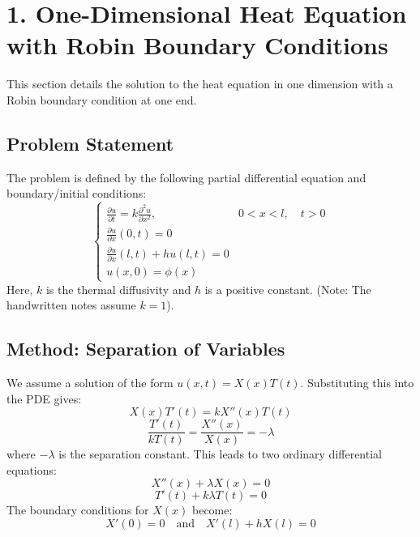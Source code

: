 \documentclass{article}
\begin{document}
	\section*{1. One-Dimensional Heat Equation with Robin Boundary Conditions}
	This section details the solution to the heat equation in one dimension with a Robin boundary condition at one end.
	
	\subsection*{Problem Statement}
	The problem is defined by the following partial differential equation and boundary/initial conditions:
	$$
	\begin{cases}
		\frac{\partial u}{\partial t} = k \frac{\partial^2 u}{\partial x^2}, & 0 < x < l, \quad t > 0 \\
		\frac{\partial u}{\partial x}(0, t) = 0 \\
		\frac{\partial u}{\partial x}(l, t) + h u(l, t) = 0 \\
		u(x, 0) = \phi(x)
	\end{cases}
	$$
	Here, $k$ is the thermal diffusivity and $h$ is a positive constant. (Note: The handwritten notes assume $k=1$).
	
	\subsection*{Method: Separation of Variables}
	We assume a solution of the form $u(x, t) = X(x)T(t)$. Substituting this into the PDE gives:
	$$ X(x)T'(t) = k X''(x)T(t) $$
	$$ \frac{T'(t)}{k T(t)} = \frac{X''(x)}{X(x)} = -\lambda $$
	where $-\lambda$ is the separation constant. This leads to two ordinary differential equations:
	$$ X''(x) + \lambda X(x) = 0 $$
	$$ T'(t) + k \lambda T(t) = 0 $$
	The boundary conditions for $X(x)$ become:
	$$ X'(0) = 0 \quad \text{and} \quad X'(l) + h X(l) = 0 $$
	
\end{document}
